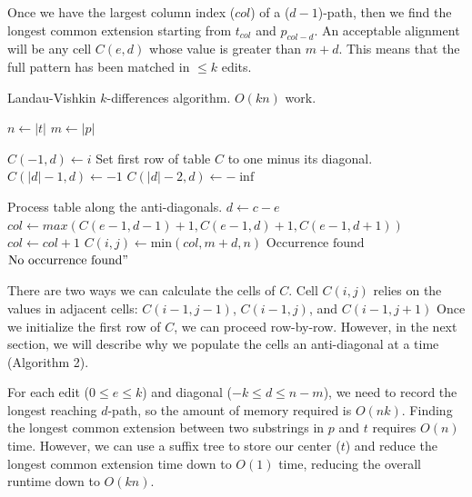 Once we have the largest column index ($col$) of a ($d-1$)-path, then we find the longest common extension starting from $t_{col}$ and $p_{col-d}$.
An acceptable alignment will be any cell $C(e,d)$ whose value is greater than $m + d$.
This means that the full pattern has been matched in $\leq k$ edits.


 \begin{algorithm}
 \caption{Landau-Vishkin $k$-differences algorithm. $O(kn)$ work.}\label{landau_vishkin}
 \begin{algorithmic}[1]
 \State $n\gets |t|$
 \State $m\gets |p|$

   \State $C(-1,d) \gets i$ \EndFor \Comment Set first row of table $C$ to one minus its diagonal. 
    \State $C(|d| - 1 ,d) \gets -1$
    \State $C(|d| - 2 ,d) \gets -\inf$
\EndFor

  \Comment Process table along the anti-diagonals.
  \State $d \gets c - e$
  \State $col \gets max(C(e-1,d-1) + 1,C(e-1,d)+ 1,C(e-1,d+1))$
    \State $col \gets col + 1$
  \EndWhile
  \State $C(i,j) \gets \text{min}(col, m + d, n)$
  \Return $\text{Occurrence found}$
  \EndIf
\EndFor
\EndFor
\Return $\text{No occurrence found}"$
\EndProcedure
\end{algorithmic}
\end{algorithm}

There are two ways we can calculate the cells of $C$.
Cell $C(i,j)$ relies on the values in adjacent cells: $C(i-1,j-1)$, $C(i-1,j)$, and $C(i-1,j+1)$
Once we initialize the first row of $C$, we can proceed row-by-row.
However, in the next section, we will describe why we populate the cells an anti-diagonal at a time (Algorithm 2).

For each edit ($0\leq e \leq k$) and diagonal ($-k \leq d \leq n-m$), we need to record the longest reaching $d$-path, so the amount of memory required is $O(nk)$.
Finding the longest common extension between two substrings in $p$ and $t$ requires $O(n)$ time.
However, we can use a suffix tree to store our center ($t$) and reduce the longest common extension time down to $O(1)$ time\cite{gusfield_algorithms_1997}, reducing the overall runtime down to $O(kn)$.

